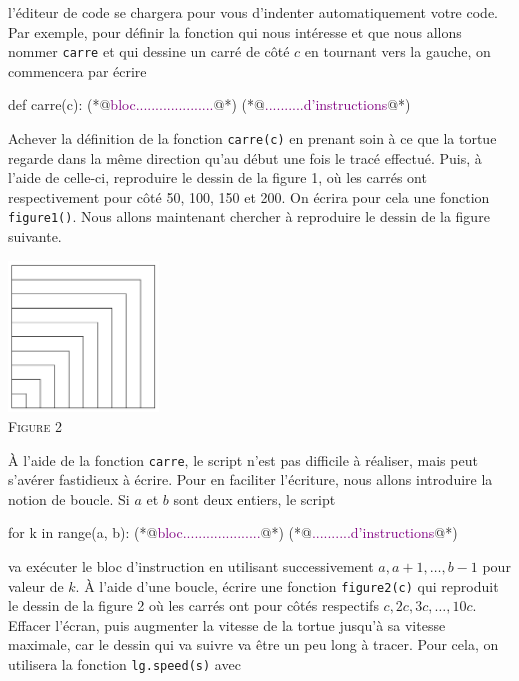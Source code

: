 \documentclass{magnoliaold}
\begin{document}
\begin{questions}
l'éditeur de code se chargera pour vous d'indenter automatiquement votre code. Par exemple, pour
définir la fonction qui nous intéresse et que nous allons nommer \verb!carre! et qui dessine un carré de côté
$c$ en tournant vers la gauche, on commencera par écrire
\begin{pythoncode}
def carre(c):
    (*@\textcolor{purple}{bloc....................}@*)
    (*@\textcolor{purple}{..........d'instructions}@*)
\end{pythoncode}
\question Achever la définition de la fonction \verb!carre(c)! en prenant soin à ce que la tortue regarde dans
  la même direction qu'au début une fois le tracé effectué. Puis, à l'aide de celle-ci, reproduire le dessin de la
  figure 1, où les carrés ont respectivement pour côté 50, 100, 150 et 200. On écrira pour cela une fonction \verb!figure1()!.
\enonce Nous allons maintenant chercher à reproduire le dessin de la figure suivante.
\begin{center}
  \includegraphics[width=0.3\textwidth]{../../commun/images/python-tp-logo-2}\\
  \textsc{Figure 2}
  \end{center}
  À l'aide de la fonction \verb!carre!, le script n'est pas difficile à réaliser, mais peut s'avérer
  fastidieux à écrire. Pour en faciliter l'écriture, nous allons introduire la notion de boucle. Si
  $a$ et $b$ sont deux entiers, le script
\begin{pythoncode}
for k in range(a, b):
    (*@\textcolor{purple}{bloc....................}@*)
    (*@\textcolor{purple}{..........d'instructions}@*)
\end{pythoncode}
va exécuter le bloc d'instruction en utilisant successivement $a, a+1, \ldots, b - 1$ pour valeur de $k$.
\question À l'aide d'une boucle, écrire une fonction
  \verb!figure2(c)! qui reproduit le dessin de la figure 2 où les carrés ont
  pour côtés respectifs $c, 2c, 3c, \ldots, 10c$.
\enonce Effacer l'écran, puis augmenter la vitesse de la tortue jusqu'à sa vitesse maximale, car le dessin
  qui va suivre va être un peu long à tracer. Pour cela, on utilisera la fonction \verb!lg.speed(s)! avec

\end{questions}
\end{document}
